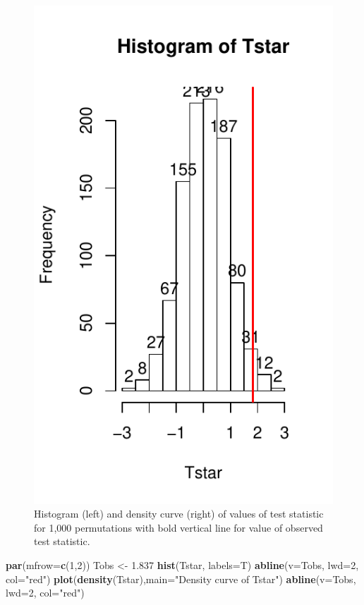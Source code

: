 \documentclass[]{book}
\newenvironment{Shaded}{\begin{snugshade}}{\end{snugshade}}
\newcommand{\KeywordTok}[1]{\textcolor[rgb]{0.13,0.29,0.53}{\textbf{#1}}}
\newcommand{\DataTypeTok}[1]{\textcolor[rgb]{0.13,0.29,0.53}{#1}}
\newcommand{\DecValTok}[1]{\textcolor[rgb]{0.00,0.00,0.81}{#1}}
\newcommand{\FloatTok}[1]{\textcolor[rgb]{0.00,0.00,0.81}{#1}}
\newcommand{\StringTok}[1]{\textcolor[rgb]{0.31,0.60,0.02}{#1}}
\newcommand{\NormalTok}[1]{#1}
\theoremstyle{definition}
\theoremstyle{definition}
\theoremstyle{remark}
\begin{document}
\begin{figure}
\centering
\includegraphics{02-reintroductionToStatistics_files/figure-latex/Figure2-10-1.pdf}
\caption{\label{fig:Figure2-10}Histogram (left) and density curve (right) of values of
test statistic for 1,000 permutations with bold vertical line for value
of observed test statistic.}
\end{figure}

\begin{Shaded}
\begin{Highlighting}[]
\KeywordTok{par}\NormalTok{(}\DataTypeTok{mfrow=}\KeywordTok{c}\NormalTok{(}\DecValTok{1}\NormalTok{,}\DecValTok{2}\NormalTok{))}
\NormalTok{Tobs <-}\StringTok{ }\FloatTok{1.837}
\KeywordTok{hist}\NormalTok{(Tstar, }\DataTypeTok{labels=}\NormalTok{T)}
\KeywordTok{abline}\NormalTok{(}\DataTypeTok{v=}\NormalTok{Tobs, }\DataTypeTok{lwd=}\DecValTok{2}\NormalTok{, }\DataTypeTok{col=}\StringTok{"red"}\NormalTok{)}
\KeywordTok{plot}\NormalTok{(}\KeywordTok{density}\NormalTok{(Tstar),}\DataTypeTok{main=}\StringTok{"Density curve of Tstar"}\NormalTok{)}
\KeywordTok{abline}\NormalTok{(}\DataTypeTok{v=}\NormalTok{Tobs, }\DataTypeTok{lwd=}\DecValTok{2}\NormalTok{, }\DataTypeTok{col=}\StringTok{"red"}\NormalTok{)}
\end{Highlighting}
\end{Shaded}
\end{document}
